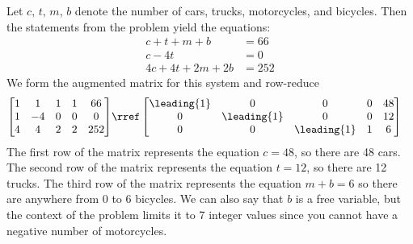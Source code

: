 Let $c,\,t,\,m,\,b$ denote the number of cars, trucks, motorcycles, and bicycles.  Then the statements from the problem yield the equations:
%
\begin{align*}
c+t+m+b&=66\\
c-4t&=0\\
4c+4t+2m+2b&=252
\end{align*}
%
We form the augmented matrix for this system and row-reduce
%
\begin{align*}
\begin{bmatrix}
1 & 1 & 1 & 1 & 66\\
1 & -4 & 0 & 0 & 0\\
4 & 4 & 2 & 2 & 252
\end{bmatrix}
&\rref
\begin{bmatrix}
\leading{1} & 0 & 0 & 0 & 48\\
0 & \leading{1} & 0 & 0 & 12\\
0 & 0 & \leading{1} & 1 & 6
\end{bmatrix}
\end{align*}
%
The first  row of the matrix represents the equation $c=48$, so there are 48 cars.    
The second row of the matrix represents the equation $t=12$, so there are 12 trucks.
The third  row of the matrix represents the equation $m+b=6$ so there are anywhere from 0 to 6 bicycles.  
We can also say that $b$ is a free variable, but the context of the problem limits it to 7 integer values since you cannot have a negative number of motorcycles.
